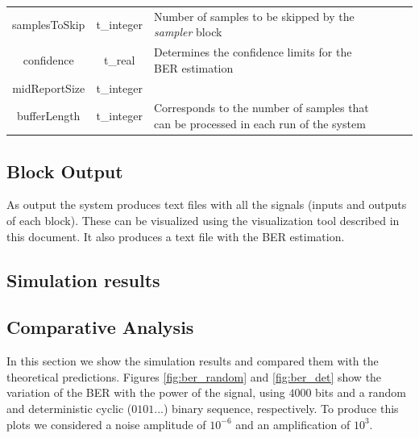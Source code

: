 \begin{table}[]
\begin{tabular}{|c|c|p{60mm}|ccp{60mm}}
		samplesToSkip & t\_integer & Number of samples to be skipped by the \textit{sampler} block &    \\ \cline{1-3}
		confidence & t\_real & Determines the confidence limits for the BER estimation &    \\ \cline{1-3}
		midReportSize & t\_integer &  &    \\ \cline{1-3}
		bufferLength & t\_integer & Corresponds to the number of samples that can be processed in each run of the system &    \\ \cline{1-3}
		\end{tabular}
		\label{table:in_par}
		\end{table}

\subsection*{Block Output}

As output the system produces text files with all the signals (inputs and outputs of each block). These can be visualized using the visualization tool described in this document. It also produces a text file with the BER estimation. 

\subsection*{Simulation results}

\subsection{Comparative Analysis}

In this section we show the simulation results and compared them with the theoretical predictions. Figures \ref{fig:ber_random} and \ref{fig:ber_det} show the variation of the BER with the power of the signal, using $4000$ bits and a random and deterministic cyclic ($0101...$) binary sequence, respectively. To produce this plots we considered a noise amplitude of $10^{-6}$ and an amplification of $10^3$. 

